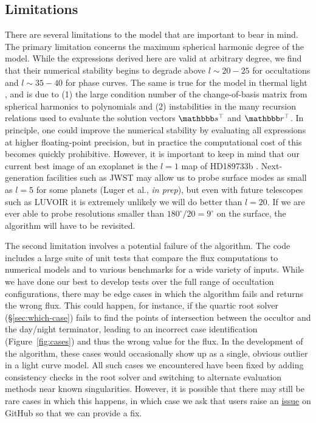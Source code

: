 \documentclass[modern]{aastex62}
\begin{document}
\subsection{Limitations}
\label{sec:limitations}

There are several limitations to the \starry model that are important
to bear in mind. The primary limitation concerns the maximum spherical
harmonic degree of the model. While the expressions derived here are
valid at arbitrary degree, we find that their numerical stability begins
to degrade above $l \sim 20-25$ for occultations and $l \sim 35-40$ for phase
curves. The same is true for the model in thermal light \citep{Luger2019},
and is due to (1) the large condition number of the change-of-basis matrix
from spherical harmonics to polynomials and (2) instabilities in the
many recursion relations used to evaluate the solution vectors
$\sT$ and $\rT$.
In principle, one could improve the numerical stability by evaluating
all expressions at higher floating-point precision, but in practice
the computational cost of this becomes quickly prohibitive.
However, it is important to keep in mind that our current best image
of an exoplanet is the $l=1$ map of HD189733b
\citep{Knutson2007,Majeau2012,deWit2012}. Next-generation facilities
such as JWST may allow us to probe surface modes as small as $l=5$
for some planets (Luger et al., \emph{in prep}), but even with future
telescopes such as LUVOIR it is extremely unlikely we will do better than
$l=20$. If we are ever able to probe resolutions smaller than
$180^\circ / 20 = 9^\circ$ on the surface, the \starry algorithm
will have to be revisited.

The second limitation involves a potential failure of the \starry
algorithm. The \starry code includes a large suite of unit tests that compare
the flux computations to numerical models and to various benchmarks
for a wide variety of inputs. While we have done our best to
develop tests over the full range of occultation configurations,
there may be edge cases in which the \starry algorithm fails and returns
the wrong flux. This could happen, for instance, if the quartic root
solver (\S\ref{sec:which-case}) fails to find the points of intersection
between the occultor and the day/night terminator, leading to
an incorrect case identification (Figure~\ref{fig:cases}) and thus the
wrong value for the flux. In the development of the algorithm, these cases
would occasionally show up as a single, obvious outlier in a light curve
model. All such cases we encountered
have been fixed by adding consistency
checks in the root solver and switching to alternate evaluation methods
near known singularities. However, it is possible that there may still be
rare cases in which this happens, in which case we ask that users
raise an \href{https://github.com/rodluger/starry/issues}{issue} on
GitHub so that we can provide a fix.
\end{document}
